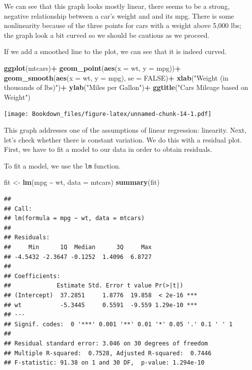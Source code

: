 \documentclass[
]{book}
\newenvironment{Shaded}{\begin{snugshade}}{\end{snugshade}}
\newcommand{\DataTypeTok}[1]{\textcolor[rgb]{0.13,0.29,0.53}{#1}}
\newcommand{\KeywordTok}[1]{\textcolor[rgb]{0.13,0.29,0.53}{\textbf{#1}}}
\newcommand{\NormalTok}[1]{#1}
\newcommand{\OperatorTok}[1]{\textcolor[rgb]{0.81,0.36,0.00}{\textbf{#1}}}
\newcommand{\OtherTok}[1]{\textcolor[rgb]{0.56,0.35,0.01}{#1}}
\newcommand{\StringTok}[1]{\textcolor[rgb]{0.31,0.60,0.02}{#1}}
\begin{document}
We can see that this graph looks mostly linear, there seems to be a strong, negative relationship between a car's weight and and its mpg. There is some nonlinearity because of the three points for cars with a weight above 5,000 lbs; the graph look a bit curved so we should be cautious as we proceed.

If we add a smoothed line to the plot, we can see that it is indeed curved.

\begin{Shaded}
\begin{Highlighting}[]
\KeywordTok{ggplot}\NormalTok{(mtcars)}\OperatorTok{+}
\StringTok{  }\KeywordTok{geom\_point}\NormalTok{(}\KeywordTok{aes}\NormalTok{(}\DataTypeTok{x =}\NormalTok{ wt, }\DataTypeTok{y =}\NormalTok{ mpg))}\OperatorTok{+}
\StringTok{  }\KeywordTok{geom\_smooth}\NormalTok{(}\KeywordTok{aes}\NormalTok{(}\DataTypeTok{x =}\NormalTok{ wt, }\DataTypeTok{y =}\NormalTok{ mpg), }\DataTypeTok{se =} \OtherTok{FALSE}\NormalTok{)}\OperatorTok{+}
\StringTok{  }\KeywordTok{xlab}\NormalTok{(}\StringTok{"Weight (in thousands of lbs)"}\NormalTok{)}\OperatorTok{+}
\StringTok{  }\KeywordTok{ylab}\NormalTok{(}\StringTok{"Miles per Gallon"}\NormalTok{)}\OperatorTok{+}
\StringTok{  }\KeywordTok{ggtitle}\NormalTok{(}\StringTok{"Car\textquotesingle{}s Mileage based on Weight"}\NormalTok{)}
\end{Highlighting}
\end{Shaded}

\texttt{[image: Bookdown\_files/figure-latex/unnamed-chunk-14-1.pdf]}

This graph addresses one of the assumptions of linear regression: linearity. Next, let's check whether there is constant variation. We do this with a residual plot. First, we have to fit a model to our data in order to obtain residuals.

To fit a model, we use the \texttt{lm} function.

\begin{Shaded}
\begin{Highlighting}[]
\NormalTok{fit \textless{}{-}}\StringTok{ }\KeywordTok{lm}\NormalTok{(mpg }\OperatorTok{\textasciitilde{}}\StringTok{ }\NormalTok{wt, }\DataTypeTok{data =}\NormalTok{ mtcars)}
\KeywordTok{summary}\NormalTok{(fit)}
\end{Highlighting}
\end{Shaded}

\begin{verbatim}
## 
## Call:
## lm(formula = mpg ~ wt, data = mtcars)
## 
## Residuals:
##     Min      1Q  Median      3Q     Max 
## -4.5432 -2.3647 -0.1252  1.4096  6.8727 
## 
## Coefficients:
##             Estimate Std. Error t value Pr(>|t|)    
## (Intercept)  37.2851     1.8776  19.858  < 2e-16 ***
## wt           -5.3445     0.5591  -9.559 1.29e-10 ***
## ---
## Signif. codes:  0 '***' 0.001 '**' 0.01 '*' 0.05 '.' 0.1 ' ' 1
## 
## Residual standard error: 3.046 on 30 degrees of freedom
## Multiple R-squared:  0.7528, Adjusted R-squared:  0.7446 
## F-statistic: 91.38 on 1 and 30 DF,  p-value: 1.294e-10
\end{verbatim}
\end{document}
